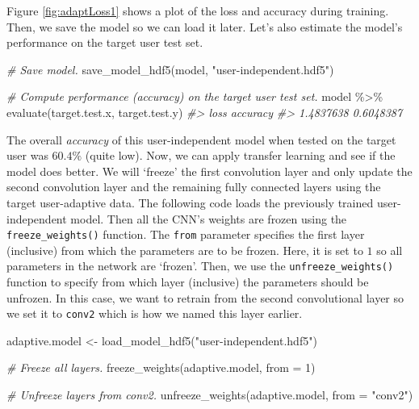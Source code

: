 \documentclass[
  11pt,
]{krantz}
\newenvironment{Shaded}{\begin{snugshade}}{\end{snugshade}}
\newcommand{\AttributeTok}[1]{\textcolor[rgb]{0.61,0.61,0.61}{#1}}
\newcommand{\CommentTok}[1]{\textcolor[rgb]{0.37,0.37,0.37}{\textit{#1}}}
\newcommand{\DecValTok}[1]{\textcolor[rgb]{0.06,0.06,0.06}{#1}}
\newcommand{\FunctionTok}[1]{\textcolor[rgb]{0,0,0}{#1}}
\newcommand{\NormalTok}[1]{#1}
\newcommand{\OtherTok}[1]{\textcolor[rgb]{0.37,0.37,0.37}{#1}}
\newcommand{\SpecialCharTok}[1]{\textcolor[rgb]{0,0,0}{#1}}
\newcommand{\StringTok}[1]{\textcolor[rgb]{0.5,0.5,0.5}{#1}}
\begin{document}
Figure \ref{fig:adaptLoss1} shows a plot of the loss and accuracy during training. Then, we save the model so we can load it later. Let's also estimate the model's performance on the target user test set.

\begin{Shaded}
\begin{Highlighting}[]
\CommentTok{\# Save model.}
\FunctionTok{save\_model\_hdf5}\NormalTok{(model, }\StringTok{"user{-}independent.hdf5"}\NormalTok{)}

\CommentTok{\# Compute performance (accuracy) on the target user test set.}
\NormalTok{model }\SpecialCharTok{\%\textgreater{}\%} \FunctionTok{evaluate}\NormalTok{(target.test.x, target.test.y)}
\CommentTok{\#\textgreater{}      loss  accuracy }
\CommentTok{\#\textgreater{} 1.4837638 0.6048387}
\end{Highlighting}
\end{Shaded}

The overall \emph{accuracy} of this user-independent model when tested on the target user was \(60.4\%\) (quite low). Now, we can apply transfer learning and see if the model does better. We will `freeze' the first convolution layer and only update the second convolution layer and the remaining fully connected layers using the target user-adaptive data. The following code loads the previously trained user-independent model. Then all the CNN's weights are frozen using the \texttt{freeze\_weights()} function. The \texttt{from} parameter specifies the first layer (inclusive) from which the parameters are to be frozen. Here, it is set to \(1\) so all parameters in the network are `frozen'. Then, we use the \texttt{unfreeze\_weights()} function to specify from which layer (inclusive) the parameters should be unfrozen. In this case, we want to retrain from the second convolutional layer so we set it to \texttt{conv2} which is how we named this layer earlier.

\begin{Shaded}
\begin{Highlighting}[]
\NormalTok{adaptive.model }\OtherTok{\textless{}{-}} \FunctionTok{load\_model\_hdf5}\NormalTok{(}\StringTok{"user{-}independent.hdf5"}\NormalTok{)}

\CommentTok{\# Freeze all layers.}
\FunctionTok{freeze\_weights}\NormalTok{(adaptive.model, }\AttributeTok{from =} \DecValTok{1}\NormalTok{)}

\CommentTok{\# Unfreeze layers from conv2.}
\FunctionTok{unfreeze\_weights}\NormalTok{(adaptive.model, }\AttributeTok{from =} \StringTok{"conv2"}\NormalTok{)}
\end{Highlighting}
\end{Shaded}
\end{document}
